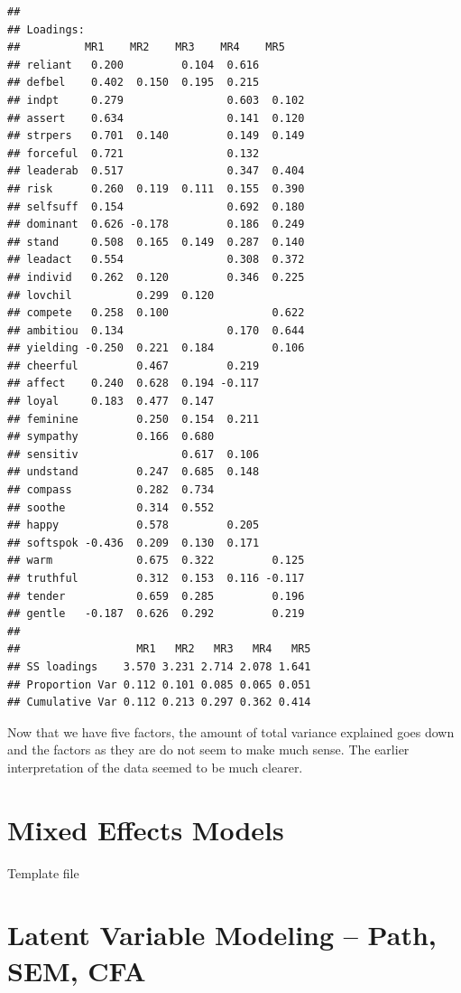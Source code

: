 \documentclass[]{book}
\theoremstyle{definition}
\theoremstyle{definition}
\theoremstyle{definition}
\theoremstyle{remark}
\begin{document}
\begin{verbatim}
## 
## Loadings:
##          MR1    MR2    MR3    MR4    MR5   
## reliant   0.200         0.104  0.616       
## defbel    0.402  0.150  0.195  0.215       
## indpt     0.279                0.603  0.102
## assert    0.634                0.141  0.120
## strpers   0.701  0.140         0.149  0.149
## forceful  0.721                0.132       
## leaderab  0.517                0.347  0.404
## risk      0.260  0.119  0.111  0.155  0.390
## selfsuff  0.154                0.692  0.180
## dominant  0.626 -0.178         0.186  0.249
## stand     0.508  0.165  0.149  0.287  0.140
## leadact   0.554                0.308  0.372
## individ   0.262  0.120         0.346  0.225
## lovchil          0.299  0.120              
## compete   0.258  0.100                0.622
## ambitiou  0.134                0.170  0.644
## yielding -0.250  0.221  0.184         0.106
## cheerful         0.467         0.219       
## affect    0.240  0.628  0.194 -0.117       
## loyal     0.183  0.477  0.147              
## feminine         0.250  0.154  0.211       
## sympathy         0.166  0.680              
## sensitiv                0.617  0.106       
## undstand         0.247  0.685  0.148       
## compass          0.282  0.734              
## soothe           0.314  0.552              
## happy            0.578         0.205       
## softspok -0.436  0.209  0.130  0.171       
## warm             0.675  0.322         0.125
## truthful         0.312  0.153  0.116 -0.117
## tender           0.659  0.285         0.196
## gentle   -0.187  0.626  0.292         0.219
## 
##                  MR1   MR2   MR3   MR4   MR5
## SS loadings    3.570 3.231 2.714 2.078 1.641
## Proportion Var 0.112 0.101 0.085 0.065 0.051
## Cumulative Var 0.112 0.213 0.297 0.362 0.414
\end{verbatim}

Now that we have five factors, the amount of total variance explained
goes down and the factors as they are do not seem to make much sense.
The earlier interpretation of the data seemed to be much clearer.

\chapter{Mixed Effects Models}\label{mixed-effects-models}

Template file

\chapter{Latent Variable Modeling -- Path, SEM,
CFA}\label{latent-variable-modeling-path-sem-cfa}
\end{document}
